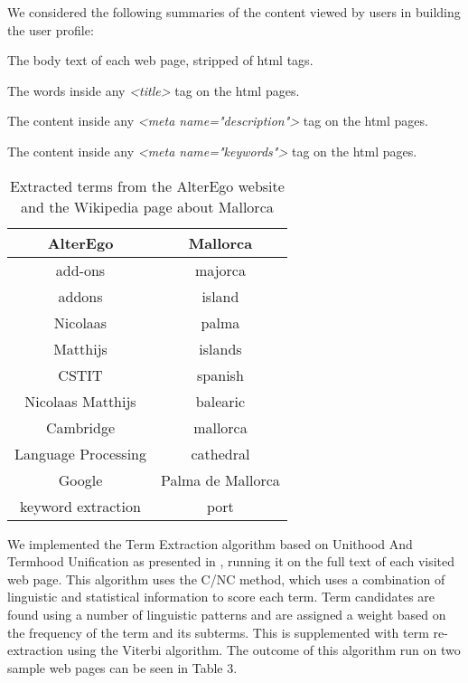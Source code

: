 \documentclass{sig-alternate}
\begin{document}
We considered the following summaries of the content viewed by users in building the user profile:
\vspace{3mm}


The body text of each web page, stripped of html tags.

\vspace{1mm}

The words inside any \emph{<title>} tag on the html pages.

\vspace{1mm}

The content inside any \emph{<meta name="description">} tag on the html pages.

\vspace{1mm}

The content inside any \emph{<meta name="keywords">} tag on the html pages.

\vspace{1mm}

\begin{table}
\centering
\caption{Extracted terms from the AlterEgo website and the Wikipedia page about Mallorca}
\begin{tabular}{|c||c|} \hline
\textbf{AlterEgo}&\textbf{Mallorca}\\ \hline
add-ons&majorca\\ \hline
addons&island\\ \hline
Nicolaas&palma\\ \hline
Matthijs&islands\\ \hline
CSTIT&spanish\\ \hline
Nicolaas Matthijs&balearic\\ \hline
Cambridge&mallorca\\ \hline
Language Processing&cathedral\\ \hline
Google&Palma de Mallorca\\ \hline
keyword extraction&port\\
\hline\end{tabular}
\end{table}

We implemented the Term Extraction algorithm based on Unithood And Termhood Unification as presented in \cite{Vu:Ti}, running it on the full text of each visited web page. This algorithm uses the C/NC method, which uses a combination of linguistic and statistical information to score each term. Term candidates are found using a number of linguistic patterns and are assigned a weight based on the frequency of the term and its subterms. This is supplemented with term re-extraction using the Viterbi algorithm. The outcome of this algorithm run on two sample web pages can be seen in Table 3.
\end{document}
